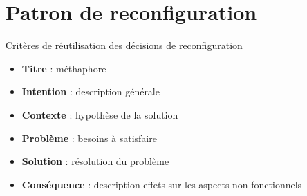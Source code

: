 \section{Patron de reconfiguration}

\begin{frame}{Critères de réutilisation des décisions de reconfiguration}
\begin{itemize}
\setlength\itemsep{0.7cm}
\item \textbf{Titre} : méthaphore                                                                   
\item \textbf{Intention} : description générale                                                                   
\item \textbf{Contexte} : hypothèse de la solution                                                                    
\item \textbf{Problème} : besoins à satisfaire                                                                     
\item \textbf{Solution} : résolution du problème                                                                     
\item \textbf{Conséquence} : description effets sur les aspects non
fonctionnels                                                              
\end{itemize} 
\end{frame}


